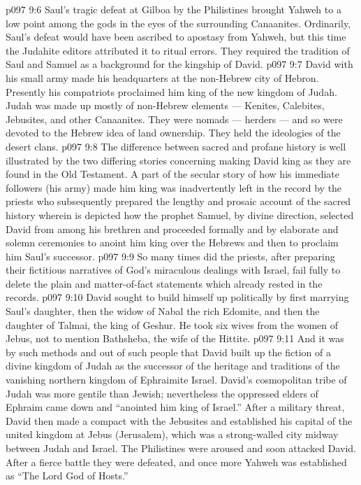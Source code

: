\vs p097 9:6 Saul’s tragic defeat at Gilboa by the Philistines brought Yahweh to a low point among the gods in the eyes of the surrounding Canaanites. Ordinarily, Saul’s defeat would have been ascribed to apostasy from Yahweh, but this time the Judahite editors attributed it to ritual errors. They required the tradition of Saul and Samuel as a background for the kingship of David.
\vs p097 9:7 David with his small army made his headquarters at the non\hyp{}Hebrew city of Hebron. Presently his compatriots proclaimed him king of the new kingdom of Judah. Judah was made up mostly of non\hyp{}Hebrew elements --- Kenites, Calebites, Jebusites, and other Canaanites. They were nomads --- herders --- and so were devoted to the Hebrew idea of land ownership. They held the ideologies of the desert clans.
\vs p097 9:8 \pc The difference between sacred and profane history is well illustrated by the two differing stories concerning making David king as they are found in the Old Testament. A part of the secular story of how his immediate followers (his army) made him king was inadvertently left in the record by the priests who subsequently prepared the lengthy and prosaic account of the sacred history wherein is depicted how the prophet Samuel, by divine direction, selected David from among his brethren and proceeded formally and by elaborate and solemn ceremonies to anoint him king over the Hebrews and then to proclaim him Saul’s successor.
\vs p097 9:9 So many times did the priests, after preparing their fictitious narratives of God’s miraculous dealings with Israel, fail fully to delete the plain and matter\hyp{}of\hyp{}fact statements which already rested in the records.
\vs p097 9:10 \pc David sought to build himself up politically by first marrying Saul’s daughter, then the widow of Nabal the rich Edomite, and then the daughter of Talmai, the king of Geshur. He took six wives from the women of Jebus, not to mention Bathsheba, the wife of the Hittite.
\vs p097 9:11 And it was by such methods and out of such people that David built up the fiction of a divine kingdom of Judah as the successor of the heritage and traditions of the vanishing northern kingdom of Ephraimite Israel. David’s cosmopolitan tribe of Judah was more gentile than Jewish; nevertheless the oppressed elders of Ephraim came down and “anointed him king of Israel.” After a military threat, David then made a compact with the Jebusites and established his capital of the united kingdom at Jebus (Jerusalem), which was a strong\hyp{}walled city midway between Judah and Israel. The Philistines were aroused and soon attacked David. After a fierce battle they were defeated, and once more Yahweh was established as “The Lord God of Hosts.”
